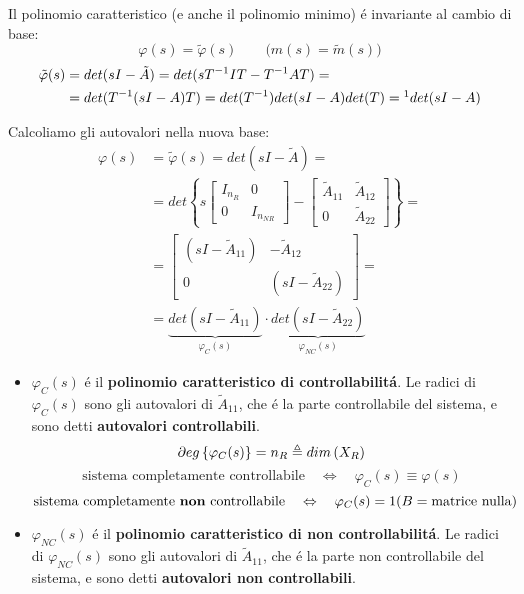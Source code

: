 \documentclass[../main.tex]{subfiles}
\begin{document}
		\newline
		
		Il polinomio caratteristico (e anche il polinomio minimo) \'e invariante al cambio di base:
		\[ \varphi(s) = \tilde \varphi(s) \qquad \big(  m(s) = \tilde m(s) \big) \]
		\begin{align*}
			\tilde \varphi(s) &= det(sI-\tilde A) = det(s T^{-1} I T - T^{-1} A T) =\\
			&= det(T^{-1} (sI-A) T) = det(T^{-1}) det(sI-A) det(T) =\footnotemark det(sI-A) 
		\end{align*}
		
		Calcoliamo gli autovalori nella nuova base:
		\begin{align*}
			\varphi(s) &= \tilde \varphi(s) = det(sI-\tilde A) =\\
			&= det\left\lbrace s
			\begin{bmatrix}
				I_{n_R} & 0\\
				0 & I_{n_{NR}}
			\end{bmatrix} -
			\begin{bmatrix}
				\tilde A_{11} & \tilde A_{12}\\
				0 & \tilde A_{22}
			\end{bmatrix} \right\rbrace =\\
			&=
			\begin{bmatrix}
				(sI-\tilde A_{11}) & -\tilde A_{12}\\
				0 & (sI-\tilde A_{22})
			\end{bmatrix} =\\
			&= \underbrace{det(sI-\tilde A_{11})}_{\varphi_C(s)} \cdot \underbrace{det(sI-\tilde A_{22})}_{\varphi_{NC}(s)}
		\end{align*}
		\begin{itemize}
			\item
				$ \varphi_C(s) $ \'e il \textbf{polinomio caratteristico di controllabilit\'a}. Le radici di $ \varphi_C(s) $ sono gli autovalori di $ \tilde A_{11} $, che \'e la parte controllabile del sistema, e sono detti \textbf{autovalori controllabili}.
				\[ \partial eg \left\lbrace \varphi_C(s) \right\rbrace = n_R \triangleq dim\left( X_R \right) \]
				\[ \text{sistema completamente controllabile} \quad\Leftrightarrow\quad \varphi_C(s) \equiv \varphi(s) \]
				\[ \text{sistema completamente \textbf{non} controllabile} \quad\Leftrightarrow\quad \varphi_C(s) = 1 (B = \text{matrice nulla}) \]
			\item
				$ \varphi_{NC}(s) $ \'e il \textbf{polinomio caratteristico di non controllabilit\'a}. Le radici di $ \varphi_{NC}(s) $ sono gli autovalori di $ \tilde A_{11} $, che \'e la parte non controllabile del sistema, e sono detti \textbf{autovalori non controllabili}.
		\end{itemize}
	
\end{document}
